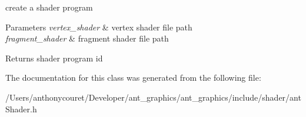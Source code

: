 create a shader program 


\begin{DoxyParams}{Parameters}
{\em vertex\+\_\+shader} & vertex shader file path \\
\hline
{\em fragment\+\_\+shader} & fragment shader file path \\
\hline
\end{DoxyParams}
\begin{DoxyReturn}{Returns}
shader program id 
\end{DoxyReturn}


The documentation for this class was generated from the following file\+:\begin{DoxyCompactItemize}
\item 
/\+Users/anthonycouret/\+Developer/ant\+\_\+graphics/ant\+\_\+graphics/include/shader/ant\+Shader.\+h\end{DoxyCompactItemize}
